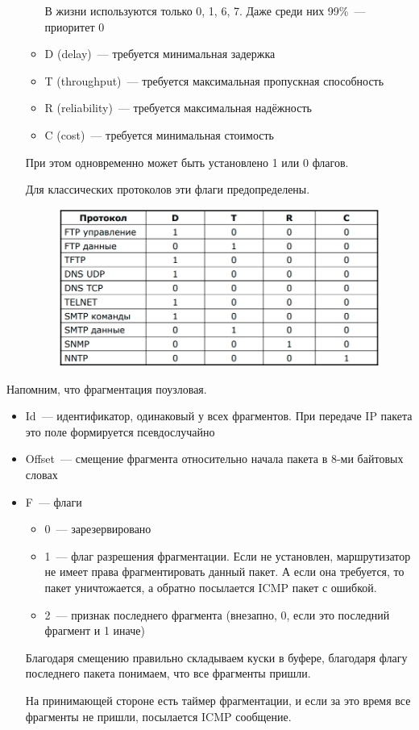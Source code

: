 \begin{itemize}
\begin{itemize}
        В жизни используются только 0, 1, 6, 7. Даже среди них 99\%~--- приоритет 0

        \item D (delay)~--- требуется минимальная задержка
        \item T (throughput)~--- требуется максимальная пропускная способность
        \item R (reliability)~--- требуется максимальная надёжность
        \item C (cost)~--- требуется минимальная стоимость
    \end{itemize}

    При этом одновременно может быть установлено 1 или 0 флагов.

    Для классических протоколов эти флаги предопределены.

    \begin{figure}[H]
        \centering
        \includegraphics[width=15cm]{images/02/03}
    \end{figure}
\end{itemize}


Напомним, что фрагментация поузловая.

\begin{itemize}
    \item Id~--- идентификатор, одинаковый у всех фрагментов. При передаче IP пакета это поле формируется псевдослучайно
    \item Offset~--- смещение фрагмента относительно начала пакета в 8-ми байтовых словах
    \item F~--- флаги
    \begin{itemize}
        \item 0~--- зарезервировано
        \item 1~--- флаг разрешения фрагментации. Если не установлен, маршрутизатор не имеет права фрагментировать данный пакет. А если она требуется, то пакет уничтожается, а обратно посылается ICMP пакет с ошибкой.
        \item 2~--- признак последнего фрагмента (внезапно, 0, если это последний фрагмент и 1 иначе)
    \end{itemize}

    Благодаря смещению правильно складываем куски в буфере, благодаря флагу последнего пакета понимаем, что все фрагменты пришли.

    На принимающей стороне есть таймер фрагментации, и если за это время все фрагменты не пришли, посылается ICMP сообщение.
\end{itemize}

